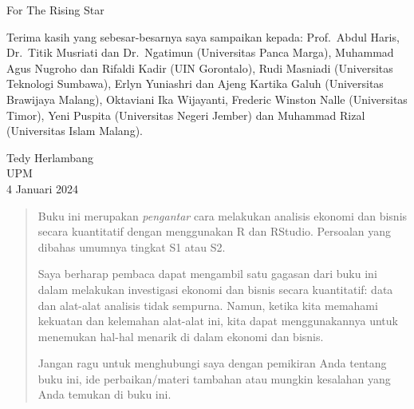 \documentclass[a4paper, nobind]{templates/ociamthesis}
\begin{document}
\begin{romanpages}

\maketitle

\begin{dedication}
  For The Rising Star
\end{dedication}



\begin{acknowledgements}
 	Terima kasih yang sebesar-besarnya saya sampaikan kepada: Prof.~Abdul Haris, Dr.~Titik Musriati dan Dr.~Ngatimun (Universitas Panca Marga), Muhammad Agus Nugroho dan Rifaldi Kadir (UIN Gorontalo), Rudi Masniadi (Universitas Teknologi Sumbawa), Erlyn Yuniashri dan Ajeng Kartika Galuh (Universitas Brawijaya Malang), Oktaviani Ika Wijayanti, Frederic Winston Nalle (Universitas Timor), Yeni Puspita (Universitas Negeri Jember) dan Muhammad Rizal (Universitas Islam Malang).

 \begin{flushright}
 Tedy Herlambang \\
 UPM \\
 4 Januari 2024
 \end{flushright}
\end{acknowledgements}





\renewcommand{\abstracttitle}{Sinopsis}
\begin{abstract}
	Buku ini merupakan \emph{pengantar} cara melakukan analisis ekonomi dan bisnis secara kuantitatif dengan menggunakan R dan RStudio. Persoalan yang dibahas umumnya tingkat S1 atau S2.

Saya berharap pembaca dapat mengambil satu gagasan dari buku ini dalam melakukan investigasi ekonomi dan bisnis secara kuantitatif: data dan alat-alat analisis tidak sempurna. Namun, ketika kita memahami kekuatan dan kelemahan alat-alat ini, kita dapat menggunakannya untuk menemukan hal-hal menarik di dalam ekonomi dan bisnis.

Jangan ragu untuk menghubungi saya dengan pemikiran Anda tentang buku ini, ide perbaikan/materi tambahan atau mungkin kesalahan yang Anda temukan di buku ini.
\end{abstract}




\end{romanpages}
\end{document}
